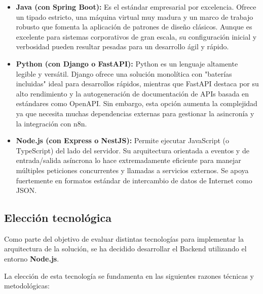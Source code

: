 \documentclass[12pt, a4paper]{book}
\begin{document}
\begin{itemize}
    \item \textbf{Java (con Spring Boot):} Es el estándar empresarial por excelencia. Ofrece un tipado estricto, una máquina virtual muy madura y un marco de trabajo robusto que fomenta la aplicación de patrones de diseño clásicos. Aunque es excelente para sistemas corporativos de gran escala, su configuración inicial y verbosidad pueden resultar pesadas para un desarrollo ágil y rápido.
    \item \textbf{Python (con Django o FastAPI):} Python es un lenguaje altamente legible y versátil. Django ofrece una solución monolítica con "baterías incluidas" ideal para desarrollos rápidos, mientras que FastAPI destaca por su alto rendimiento y la autogeneración de documentación de APIs basada en estándares como OpenAPI. Sin embargo, esta opción aumenta la complejidad ya que necesita muchas dependencias externas para gestionar la asincronía y la integración con n8n.
    \item \textbf{Node.js (con Express o NestJS):} Permite ejecutar JavaScript (o TypeScript) del lado del servidor. Su arquitectura orientada a eventos y de entrada/salida asíncrona lo hace extremadamente eficiente para manejar múltiples peticiones concurrentes y llamadas a servicios externos. Se apoya fuertemente en formatos estándar de intercambio de datos de Internet como JSON.
\end{itemize}

\subsection{Elección tecnológica}

Como parte del objetivo de evaluar distintas tecnologías para implementar la arquitectura de la solución, se ha decidido desarrollar el Backend utilizando el entorno \textbf{Node.js}.

La elección de esta tecnología se fundamenta en las siguientes razones técnicas y metodológicas:
\end{document}
